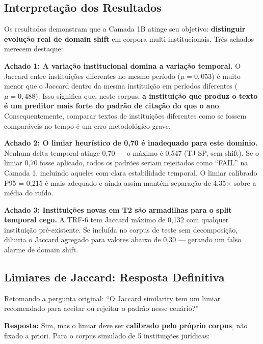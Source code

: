 \documentclass[12pt,a4paper]{article}
\theoremstyle{remark}
\begin{document}
\subsection{Interpretação dos Resultados}

Os resultados demonstram que a Camada 1B atinge seu objetivo: \textbf{distinguir evolução real de domain shift} em corpora multi-institucionais. Três achados merecem destaque:

\textbf{Achado 1: A variação institucional domina a variação temporal.} O Jaccard entre instituições diferentes no mesmo período ($\mu = 0,053$) é muito menor que o Jaccard dentro da mesma instituição em períodos diferentes ($\mu = 0,488$). Isso significa que, neste corpus, \textbf{a instituição que produz o texto é um preditor mais forte do padrão de citação do que o ano}. Consequentemente, comparar textos de instituições diferentes como se fossem comparáveis no tempo é um erro metodológico grave.

\textbf{Achado 2: O limiar heurístico de 0,70 é inadequado para este domínio.} Nenhum delta temporal atinge 0,70 — o máximo é 0,547 (TJ-SP, sem shift). Se o limiar 0,70 fosse aplicado, todos os padrões seriam rejeitados como ``FAIL'' na Camada 1, incluindo aqueles com clara estabilidade temporal. O limiar calibrado P95 = 0,215 é mais adequado e ainda assim mantém separação de 4,35$\times$ sobre a média do ruído.

\textbf{Achado 3: Instituições novas em T2 são armadilhas para o split temporal cego.} A TRF-6 tem Jaccard máximo de 0,132 com qualquer instituição pré-existente. Se incluída no corpus de teste sem decomposição, diluiria o Jaccard agregado para valores abaixo de 0,30 — gerando um falso alarme de domain shift.

\subsection{Limiares de Jaccard: Resposta Definitiva}

Retomando a pergunta original: ``O Jaccard similarity tem um limiar recomendado para aceitar ou rejeitar o padrão nesse cenário?''

\textbf{Resposta:} Sim, mas o limiar deve ser \textbf{calibrado pelo próprio corpus}, não fixado a priori. Para o corpus simulado de 5 instituições jurídicas:
\end{document}
